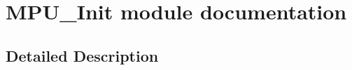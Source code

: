 \hypertarget{group___m_p_u___init__module}{}\section{M\+P\+U\+\_\+\+Init module documentation}
\label{group___m_p_u___init__module}


\subsection{Detailed Description}
